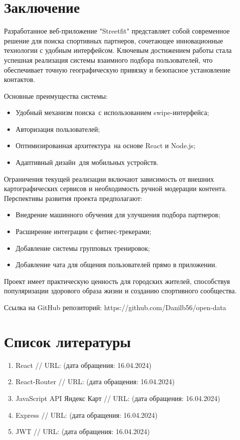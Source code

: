 \documentclass[14pt]{article}
\begin{document}
\newpage
\section*{Заключение}

Разработанное веб-приложение "Streetfit" представляет собой современное решение для поиска
спортивных партнеров, сочетающее инновационные технологии с удобным интерфейсом. Ключевым
достижением работы стала успешная реализация системы взаимного подбора пользователей, что
обеспечивает точную географическую привязку и безопасное установление контактов.

Основные преимущества системы:
\begin{itemize}
	\item Удобный механизм поиска с использованием swipe-интерфейса;
	\item Авторизация пользователей;
	\item Оптимизированная архитектура на основе React и Node.js;
	\item Адаптивный дизайн для мобильных устройств.
\end{itemize}

Ограничения текущей реализации включают зависимость от внешних картографических сервисов и
необходимость ручной модерации контента. Перспективы развития проекта предполагают:
\begin{itemize}
	\item Внедрение машинного обучения для улучшения подбора партнеров;
	\item Расширение интеграции с фитнес-трекерами;
	\item Добавление системы групповых тренировок;
	\item Добавление чата для общения пользователей прямо в приложении.
\end{itemize}

Проект имеет практическую ценность для городских жителей, способствуя популяризации здорового образа жизни и созданию спортивного сообщества.

Ссылка на GitHub репозиторий: https://github.com/Danilb56/open-data
\newpage
\section*{Список литературы}
\begin{enumerate}
	\item React // URL: (дата обращения: 16.04.2024)
	\item React-Router // URL: (дата обращения: 16.04.2024)
	\item JavaScript API Яндекс Карт // URL: (дата обращения: 16.04.2024)
	\item Express // URL: (дата обращения: 16.04.2024)
	\item JWT // URL: (дата обращения: 16.04.2024)
\end{enumerate}
\end{document}
